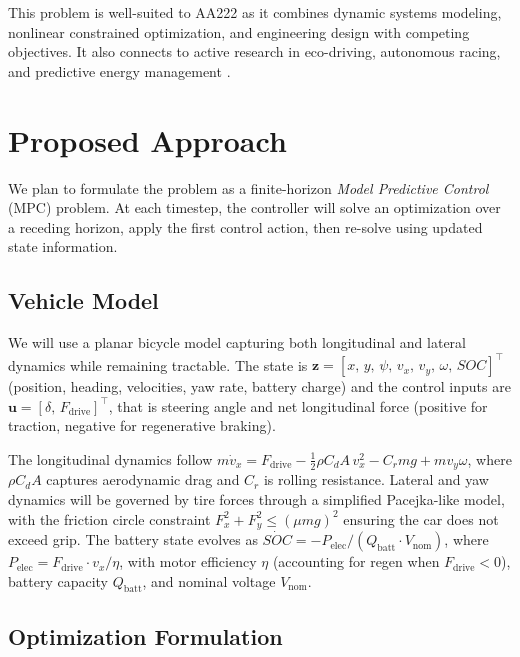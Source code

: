 \documentclass[twoside,11pt]{article}
\begin{document}
This problem is well-suited to AA222 as it combines dynamic systems modeling, nonlinear constrained optimization, and engineering design with competing objectives. It also connects to active research in eco-driving, autonomous racing, and predictive energy management \citep{Sciarretta2007, Kochenderfer2019}.

\section{Proposed Approach}
\vspace{-0.05in}

We plan to formulate the problem as a finite-horizon \emph{Model Predictive Control} (MPC) problem. At each timestep, the controller will solve an optimization over a receding horizon, apply the first control action, then re-solve using updated state information.

\vspace{-0.05in}
\subsection*{Vehicle Model}
\vspace{-0.05in}

We will use a planar bicycle model capturing both longitudinal and lateral dynamics while remaining tractable. The state is $\mathbf{z} = [x,\, y,\, \psi,\, v_x,\, v_y,\, \omega,\, SOC]^\top$ (position, heading, velocities, yaw rate, battery charge) and the control inputs are $\mathbf{u} = [\delta,\, F_{\text{drive}}]^\top$, that is steering angle and net longitudinal force (positive for traction, negative for regenerative braking).

The longitudinal dynamics follow $m \dot{v}_x = F_{\text{drive}} - \tfrac{1}{2} \rho C_d A\, v_x^2 - C_r m g + m v_y \omega$, where $\rho C_d A$ captures aerodynamic drag and $C_r$ is rolling resistance. Lateral and yaw dynamics will be governed by tire forces through a simplified Pacejka-like model, with the friction circle constraint $F_x^2 + F_y^2 \leq (\mu m g)^2$ ensuring the car does not exceed grip.
The battery state evolves as $\dot{SOC} = -{P_{\text{elec}}}/{(Q_{\text{batt}} \cdot V_{\text{nom}})}$, where $P_{\text{elec}} = {F_{\text{drive}} \cdot v_x}/{\eta}$, with motor efficiency $\eta$ (accounting for regen when $F_{\text{drive}} < 0$), battery capacity $Q_{\text{batt}}$, and nominal voltage $V_{\text{nom}}$.

\vspace{-0.05in}
\subsection*{Optimization Formulation}
\vspace{-0.05in}
\end{document}
